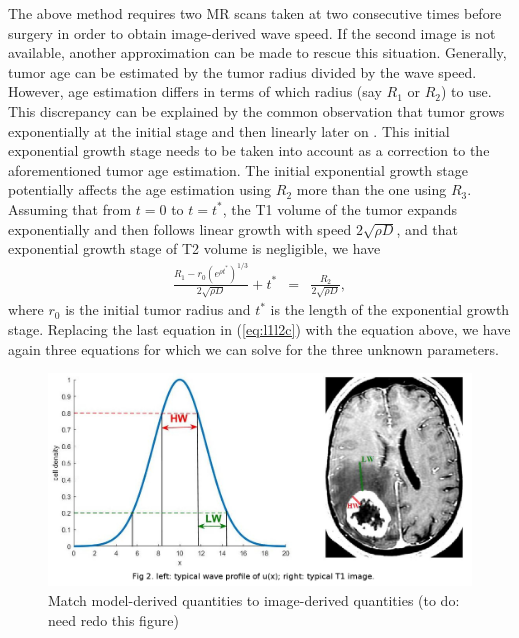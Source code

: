 \documentclass{aims}
\numberwithin{equation}{section}
\begin{document}
The above method requires two MR scans taken at two consecutive times
before surgery in order to obtain image-derived wave speed. If the
second image is not available, another approximation can be made to
rescue this situation. Generally, tumor age can be estimated by the
tumor radius divided by the wave speed. However, age estimation differs
in terms of which radius (say $R_{1}$ or $R_{2}$) to use. This discrepancy
can be explained by the common observation that tumor grows exponentially
at the initial stage and then linearly later on \cite{Kuang}. This
initial exponential growth stage needs to be taken into account as
a correction to the aforementioned tumor age estimation. The initial
exponential growth stage potentially affects the age estimation using
$R_{2}$ more than the one using $R_{3}$. Assuming that from $t=0$
to $t=t^{*}$, the T1 volume of the tumor expands exponentially and
then follows linear growth with speed $2\sqrt{\rho D}$, and that
exponential growth stage of T2 volume is negligible, we have 
\begin{eqnarray*}
\frac{R_{1}-r_{0}(e^{\rho t^{*}})^{1/3}}{2\sqrt{\rho D}}+t^{*} & = & \frac{R_{2}}{2\sqrt{\rho D}},
\end{eqnarray*}
where $r_{0}$ is the initial tumor radius and $t^{*}$ is the length
of the exponential growth stage. Replacing the last equation in (\ref{eq:l1l2c})
with the equation above, we have again three equations for which we
can solve for the three unknown parameters. 

\begin{figure}
\begin{center}
\includegraphics[scale=0.3]{plots/Fig2.JPG}
\end{center}
\caption{\label{fig:Match wid}Match model-derived quantities to image-derived
quantities (to do: need redo this figure)}

\end{figure}
\end{document}
